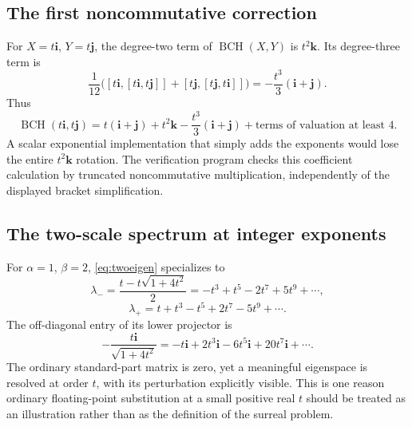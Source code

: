 \documentclass[11pt,letterpaper]{article}
\numberwithin{equation}{section}
\theoremstyle{definition}
\theoremstyle{remark}
\newcommand{\ii}{\mathbf i}
\newcommand{\jj}{\mathbf j}
\newcommand{\kk}{\mathbf k}
\newcommand{\BCH}{\operatorname{BCH}}
\begin{document}
\subsection{The first noncommutative correction}
For $X=t\ii$, $Y=t\jj$, the degree-two term of $\BCH(X,Y)$ is $t^2\kk$. Its degree-three
term is
\[
 \frac1{12}\bigl([t\ii,[t\ii,t\jj]]+[t\jj,[t\jj,t\ii]]\bigr)
 =-\frac{t^3}{3}(\ii+\jj).
\]
Thus
\[
 \BCH(t\ii,t\jj)
 =t(\ii+\jj)+t^2\kk-\frac{t^3}{3}(\ii+\jj)
  +\text{terms of valuation at least }4.
\]
A scalar exponential implementation that simply adds the exponents would lose the entire
$t^2\kk$ rotation. The verification program checks this coefficient calculation by truncated
noncommutative multiplication, independently of the displayed bracket simplification.

\subsection{The two-scale spectrum at integer exponents}
For $\alpha=1$, $\beta=2$, \eqref{eq:twoeigen} specializes to
\[
 \lambda_-=\frac{t-t\sqrt{1+4t^2}}2
 =-t^3+t^5-2t^7+5t^9+\cdots,
\]
\[
 \lambda_+=t+t^3-t^5+2t^7-5t^9+\cdots.
\]
The off-diagonal entry of its lower projector is
\[
 -\frac{t\ii}{\sqrt{1+4t^2}}
 =-t\ii+2t^3\ii-6t^5\ii+20t^7\ii+\cdots.
\]
The ordinary standard-part matrix is zero, yet a meaningful eigenspace is resolved at order
$t$, with its perturbation explicitly visible. This is one reason ordinary floating-point
substitution at a small positive real $t$ should be treated as an illustration rather than as
the definition of the surreal problem.
\end{document}
